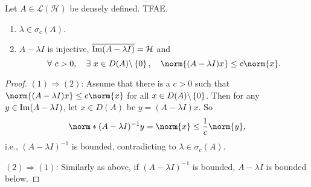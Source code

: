 \documentclass[a4paper,12pt]{article}
\begin{document}
\begin{prop}
    Let $A \in \mathcal{L}(\mathcal{H})$ be densely defined. TFAE.
    \begin{enumerate}[label=(\arabic{*})]
        \item $\lambda \in \sigma_c(A)$.
        \item $A-\lambda I$ is injective, $\overline{\operatorname{Im}(A - \lambda I)} = \mathcal{H}$ and
        \begin{equation*}
            \forall~c > 0,\quad \exists~ x\in D(A) \backslash \bb{0},\quad\norm{(A - \lambda I)x} \leq c\norm{x}.
        \end{equation*}
    \end{enumerate}
\end{prop}
\begin{proof}
    $(1) \Rightarrow (2)$: Assume that there is a $c > 0$ such that $\norm{(A - \lambda I)x} \leq c\norm{x}$ for all $x \in D(A) \backslash \left\{0\right\}$. Then for any $y \in \operatorname{Im}(A - \lambda I)$, let $x \in D(A)$ be $y = (A - \lambda I)x$. So
    \begin{equation*}
        \norm*{(A - \lambda I)^{-1}y} = \norm{x} \leq \frac{1}{c} \norm{y},
    \end{equation*}
    i.e., $(A - \lambda I)^{-1}$ is bounded, contradicting to $\lambda \in \sigma_c(A)$.

    \noindent $(2) \Rightarrow (1)$: Similarly as above, if $(A - \lambda I)^{-1}$ is bounded, $A - \lambda I$ is bounded below.
\end{proof}
\end{document}
